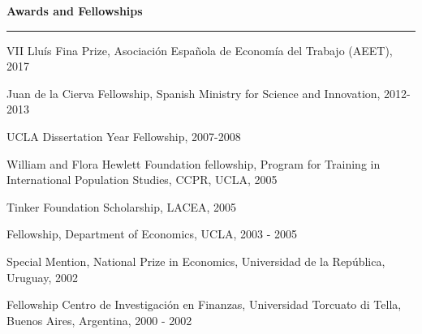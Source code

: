 \documentclass[12pt]{article}
\newcommand{\sepspace}{\vspace*{0.5em}}		%
\newcommand{\NewPart}[1]{ \vspace*{0.4cm} \noindent \large \textbf{#1}
\par \normalsize \normalfont \vspace*{-0.5cm} \noindent\rule{\textwidth}{1.8pt} \vspace*{-0.75cm} }
\newcommand{\ConferenceEntry}[2]{
		\noindent
		#1		   %
		\hspace{0em} #2 \par}     %
\begin{document}
%
%
%
%
%

\NewPart{Awards and Fellowships}{}

\ConferenceEntry{VII Lluís Fina Prize, Asociación Española de Economía del Trabajo (AEET), 2017}

\ConferenceEntry{Juan de la Cierva Fellowship, Spanish Ministry for Science and Innovation, 2012-2013}

\ConferenceEntry{UCLA Dissertation Year Fellowship, 2007-2008}{}{}

\ConferenceEntry{William and Flora Hewlett Foundation fellowship, Program for Training in International Population Studies, CCPR, UCLA, 2005}{}{}

\ConferenceEntry{Tinker Foundation Scholarship, LACEA, 2005}{}{}

\ConferenceEntry{Fellowship, Department of Economics, UCLA, 2003 - 2005}{}{}

\ConferenceEntry{Special Mention, National Prize in Economics, Universidad de la República, Uruguay, 2002}{}{}

\ConferenceEntry{Fellowship Centro de Investigación en Finanzas, Universidad Torcuato di Tella, Buenos Aires, Argentina, 2000 - 2002}{}{}
\end{document}
